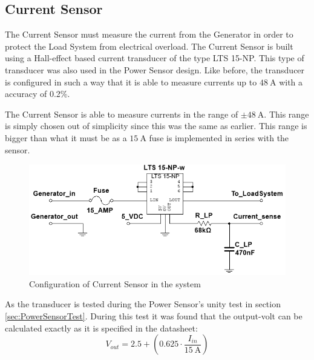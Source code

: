 \subsection{Current Sensor}
The Current Sensor must measure the current from the Generator in order to protect the Load System from electrical overload. The Current Sensor is built using a Hall-effect based current transducer of the type LTS 15-NP. This type of transducer was also used in the Power Sensor design. Like before, the transducer is configured in such a way that it is able to measure currents up to $\SI{48}{\ampere}$ with a accuracy of 0.2\%.

The Current Sensor is able to measure currents in the range of $\pm \SI{48}{\ampere}$. This range is simply chosen out of simplicity since this was the same as earlier. This range is bigger than what it must be as a $\SI{15}{\ampere}$ fuse is implemented in series with the sensor.

\begin{figure}[H]
	\centering
	\includegraphics[width=0.8\linewidth]{Hardware/LoadSystem/CurrentSensor}
	\caption{Configuration of Current Sensor in the system}
	\label{fig:CurrentSensorCircuit}
\end{figure}

As the transducer is tested during the Power Sensor's unity test in section \vref{sec:PowerSensorTest}. During this test it was found that the output-volt can be calculated exactly as it is specified in the datasheet:
\begin{equation}
	V_{out} = 2.5 + \left( 0.625 \cdot \frac{I_{in}}{\SI{15}{\ampere}}\right)
\end{equation}